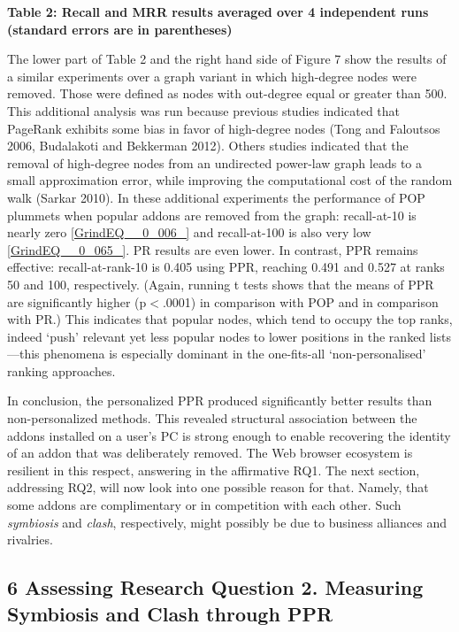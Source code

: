 \documentclass{article} %
\begin{document}
\textbf{Table 2: Recall and MRR results averaged over 4 independent runs (standard errors are in parentheses)}



 

The lower part of Table 2 and the right hand side of Figure 7 show the results of a similar experiments over a graph variant in which high-degree nodes were removed. Those were defined as nodes with out-degree equal or greater than 500. This additional analysis was run because previous studies indicated that PageRank exhibits some bias in favor of high-degree nodes (Tong and Faloutsos 2006, Budalakoti and Bekkerman 2012). Others studies indicated that the removal of high-degree nodes from an undirected power-law graph leads to a small approximation error, while improving the computational cost of the random walk (Sarkar 2010). In these additional experiments the performance of POP plummets when popular addons are removed from the graph: recall-at-10 is nearly zero \eqref{GrindEQ__0_006_} and recall-at-100 is also very low \eqref{GrindEQ__0_065_}. PR results are even lower. In contrast, PPR remains effective: recall-at-rank-10 is 0.405 using PPR, reaching 0.491 and 0.527 at ranks 50 and 100, respectively. (Again, running t tests shows that the means of PPR are significantly higher (p$<$.0001) in comparison with POP and in comparison with PR.) This indicates that popular nodes, which tend to occupy the top ranks, indeed `push' relevant yet less popular nodes to lower positions in the ranked lists---this phenomena is especially dominant in the one-fits-all `non-personalised' ranking approaches.

In conclusion, the personalized PPR produced significantly better results than non-personalized methods. This revealed structural association between the addons installed on a user's PC is strong enough to enable recovering the identity of an addon that was deliberately removed. The Web browser ecosystem is resilient in this respect, answering in the affirmative RQ1. The next section, addressing RQ2, will now look into one possible reason for that. Namely, that some addons are complimentary or in competition with each other. Such \textit{symbiosis} and \textit{clash}, respectively, might possibly be due to business alliances and rivalries.





\noindent 
\subsection{6  Assessing Research Question 2.  Measuring Symbiosis and Clash through PPR}
\end{document}
